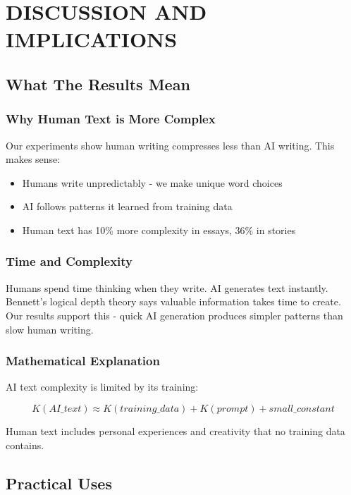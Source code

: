 \documentclass[12pt,a4paper]{report}
\begin{document}
\chapter{DISCUSSION AND IMPLICATIONS}

\section{What The Results Mean}

\subsection{Why Human Text is More Complex}

Our experiments show human writing compresses less than AI writing. This makes sense:

\begin{itemize}
    \item Humans write unpredictably - we make unique word choices
    \item AI follows patterns it learned from training data
    \item Human text has 10\% more complexity in essays, 36\% in stories
\end{itemize}

\subsection{Time and Complexity}

Humans spend time thinking when they write. AI generates text instantly. Bennett's logical depth theory says valuable information takes time to create. Our results support this - quick AI generation produces simpler patterns than slow human writing.

\subsection{Mathematical Explanation}

AI text complexity is limited by its training:

\begin{equation}
K(AI\_text) \approx K(training\_data) + K(prompt) + small\_constant
\end{equation}

Human text includes personal experiences and creativity that no training data contains.

\section{Practical Uses}
\end{document}
